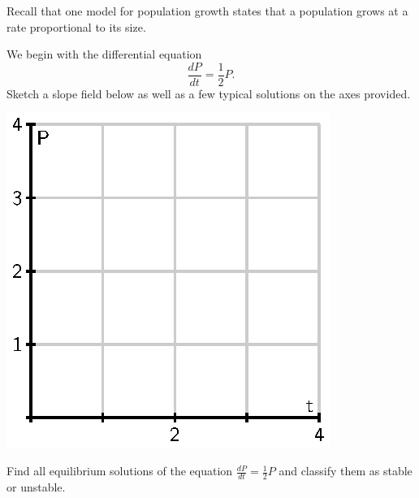 \begin{pa} \label{PA:7.6} Recall that one model for population growth states that a population grows at a rate proportional to its size.

  \ba
\item We begin with the differential equation 
  $$
  \frac{dP}{dt} = \frac12 P.
  $$
  Sketch a slope field below as well as a few typical solutions on the axes provided.

  \begin{center}
    \includegraphics{figures/7_6_preview.eps}
  \end{center}

\item Find all equilibrium solutions of the equation $\frac{dP}{dt} = \frac12 P$ and classify them as stable or
  unstable.  


\end{pa}
